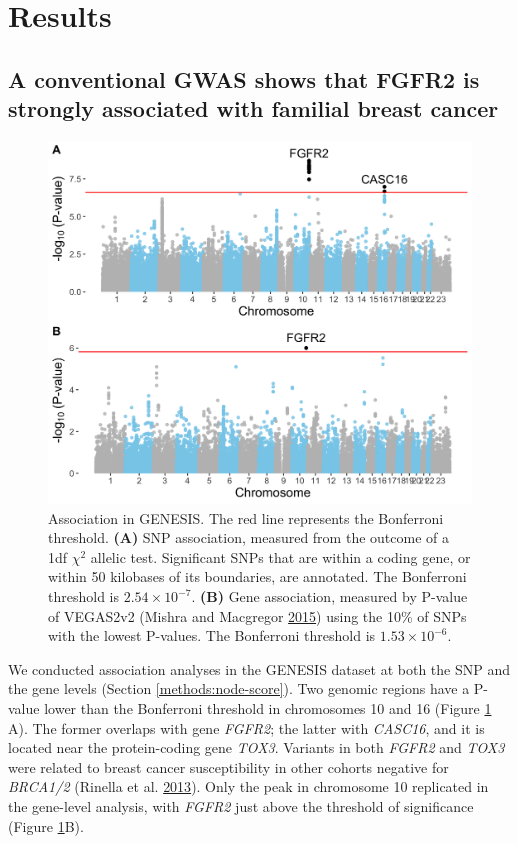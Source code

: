 \documentclass[
  11pt,
]{env/yjiao}
\begin{document}
\hypertarget{sec:orgc718f04}{%
\section{Results}\label{sec:orgc718f04}}

\hypertarget{results:conventional}{%
\subsection{A conventional GWAS shows that FGFR2 is strongly associated with familial breast cancer}\label{results:conventional}}



\begin{figure}
\centering
\includegraphics{fig/figure_1.png}
\caption{\label{fig:snp-gene-manhattan}Association in GENESIS. The red line represents the Bonferroni threshold. \textbf{(A)} SNP association, measured from the outcome of a 1df \(\chi^2\) allelic test. Significant SNPs that are within a coding gene, or within 50 kilobases of its boundaries, are annotated. The Bonferroni threshold is \(2.54 \times 10^{-7}\). \textbf{(B)} Gene association, measured by P-value of VEGAS2v2 (Mishra and Macgregor \protect\hyperlink{ref-mishra_vegas2:_2015}{2015}) using the 10\% of SNPs with the lowest P-values. The Bonferroni threshold is \(1.53 \times 10^{-6}\).}
\end{figure}

We conducted association analyses in the GENESIS dataset at both the SNP
and the gene levels (Section \ref{methods:node-score}). Two genomic regions
have a P-value lower than the Bonferroni threshold in chromosomes 10 and 16
(Figure \ref{fig:snp-gene-manhattan} A). The former overlaps with gene
\emph{FGFR2}; the latter with \emph{CASC16}, and it is located near the
protein-coding gene \emph{TOX3}. Variants in both \emph{FGFR2} and \emph{TOX3} were
related to breast cancer susceptibility in other cohorts negative for
\emph{BRCA1/2} (Rinella et al. \protect\hyperlink{ref-rinella_genetic_2013}{2013}). Only the peak in chromosome 10
replicated in the gene-level analysis, with \emph{FGFR2} just above the
threshold of significance (Figure \ref{fig:snp-gene-manhattan}B).
\end{document}
